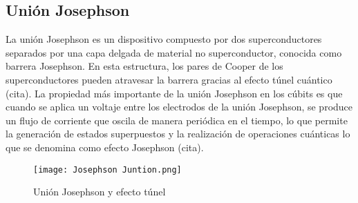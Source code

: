 
\subsection{Unión Josephson}

La unión Josephson es un dispositivo compuesto por dos superconductores separados por una capa delgada de material no superconductor, conocida como barrera Josephson. En esta estructura, los pares de Cooper de los superconductores pueden atravesar la barrera gracias al efecto túnel cuántico (cita). La propiedad más importante de la unión Josephson en los cúbits es que cuando se aplica un voltaje entre los electrodos de la unión Josephson, se produce un flujo de corriente que oscila de manera periódica en el tiempo, lo que permite la generación de estados superpuestos y la realización de operaciones cuánticas lo que se denomina como efecto Josephson (cita).  \\
\begin{figure}[ht]
    \centering
    \texttt{[image: Josephson Juntion.png]}
    \caption{Unión Josephson y efecto túnel \citep{noauthor_squid_nodate}}
    \label{fig:Unión Josephsone}
  \end{figure}
